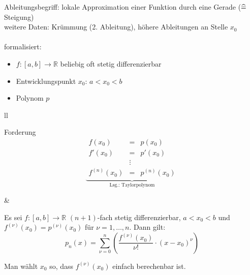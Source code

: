 Ableitungsbegriff: lokale Approximation einer Funktion durch eine Gerade ($\mathrel{\widehat{=}}$ Steigung)\\
weitere Daten: Krümmung (2. Ableitung), höhere Ableitungen an Stelle $x_0$\\\\
formalisiert:
\begin{itemize}
  \item $f: [a,b] \to \mathbb{R}$ beliebig oft stetig differenzierbar
  \item Entwicklungspunkt $x_0$: $a < x_0 < b$
  \item Polynom $p$
\end{itemize}
\noindent
\begin{tabular}{ll}
  \begin{minipage}[b]{.5\textwidth}
    Forderung
    \[
      \underbrace{\begin{array}{rcl}
        f(x_0) &=& p(x_0) \\
        f'(x_0) &=& p'(x_0) \\
        &\vdots& \\
        f^{(n)}(x_0) &=& p^{(n)}(x_0)
      \end{array}}_{\text{Lsg.: Taylorpolynom}}
    \]
  \end{minipage} &
  \color{black!70}
\end{tabular}

\begin{theorem} Es sei $f: [a,b] \to \mathbb{R}$ $(n+1)$-fach stetig differenzierbar, $a < x_0 < b$ und $f^{(\nu)}(x_0) = p^{(\nu)}(x_0)$ für $\nu = 1, \ldots, n$. Dann gilt:
  \[ p_n(x) = \sum_{\nu = 0}^n \left( \frac{f^{(\nu)}(x_0)}{\nu !} \cdot (x - x_0)^\nu \right)\]
\end{theorem}

\begin{note}
  Man wählt $x_0$ so, dass $f^{(\nu)}(x_0)$ einfach berechenbar ist.
\end{note}


